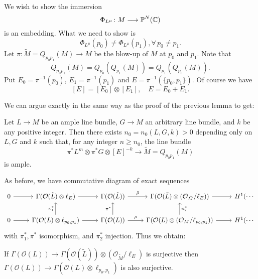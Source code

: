 \documentclass[12pt]{article}
\begin{document}
We wish to show the immersion \[
  \Phi_{L^\mu}\colon M\longrightarrow \mathbb{P}^N(\mathbb{C})
\] is an embedding. What we need to show is \[
  \Phi_{L^\mu}(p_0)\neq \Phi_{L^\mu}(p_1),\forall\,p_0\neq p_1
.\] Let \(\pi\colon \tilde{M}=Q_{p_0p_1}(M)\to M\) be the blow-up of \(M\) at
\(p_0\) and \(p_1\). Note that \[
  Q_{p_0p_1}(M)=Q_{p_0}(Q_{p_1}(M))=Q_{p_1}(Q_{p_0}(M))
.\] Put \(E_0=\pi^{-1}(p_0)\), \(E_1=\pi^{-1}(p_1)\) and \(E=\pi^{-1}(\{p_0,p_1\}
)\). Of course we have \[
  [E]=[E_0]\otimes [E_1],\quad E=E_0+E_1
.\] 

We can argue exactly in the same way as the proof of the previous lemma to get:
\begin{lemma}
  Let \(L\to M\) be an ample line bundle, \(G\to M\) an arbitrary line bundle,
  and \(k\) be any positive integer. Then there exists \(n_0=n_0(L,G,k)>0\)
  depending only on \(L,G\) and \(k\) such that, for any integer \(n\ge n_0\),
  the line bundle \[
    \pi^*L^m\otimes \pi^*G\otimes [E]^{-k}\to \tilde{M}=Q_{p_0p_1}(M)
  \] is ample.
\end{lemma}

As before, we have commutative diagram of exact sequences
\[\begin{tikzcd}
	0 & {\Gamma(\mathcal{O}(\tilde{L})\otimes\ell_E)} & {\Gamma(\mathcal{O}(\tilde{L}))} & {\Gamma(\mathcal{O}({\tilde{L}})\otimes(\mathcal{O}_{\tilde{M}}/\ell_E))} & {H^1(\cdots} \\
	0 & {\Gamma(\mathcal{O}(L)\otimes\ell_{p_0,p_1})} & {\Gamma(\mathcal{O}(L))} & {\Gamma(\mathcal{O}(L)\otimes(\mathcal{O}_M/\ell_{p_0,p_1}))} & {H^1(\cdots}
	\arrow[from=1-1, to=1-2]
	\arrow[from=2-1, to=2-2]
	\arrow["{{\pi_1^*}}", from=2-2, to=1-2]
	\arrow[from=1-2, to=1-3]
	\arrow[from=2-2, to=2-3]
	\arrow["{{\pi^*}}", from=2-3, to=1-3]
	\arrow["{{\rho}}", from=2-3, to=2-4]
	\arrow["{{\pi_2^*}}"', from=2-4, to=1-4]
	\arrow["{{\tilde{\rho}}}", from=1-3, to=1-4]
	\arrow[from=1-4, to=1-5]
	\arrow[from=2-4, to=2-5]
\end{tikzcd}\]
with \(\pi_1^*,\pi^*\) isomorphism, and \(\pi_2^*\) injection. Thus we obtain:
\begin{lemma}
  If \(\Gamma(\mathcal{O}(L))\to \Gamma(\mathcal{O}(\tilde{L}))\otimes(
  \mathcal{O}_{\tilde{M}}/\ell_E)\) is surjective then \(\Gamma(\mathcal{O}(L))
  \to \Gamma(\mathcal{O}(L)\otimes \ell_{p_0,p_1})\) is also surjective.
\end{lemma}
\end{document}
